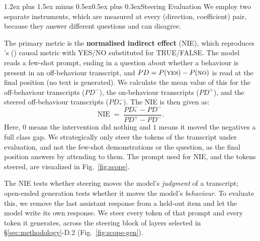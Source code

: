 \documentclass[conference]{IEEEtran}
\makeatletter
\renewcommand{\subsubsection}{\@startsection{subsubsection}{3}{1em}%
  {1.2ex plus 1.5ex minus 0.5ex}{0.5ex plus 0.3ex}{\normalfont\normalsize\itshape}}
\makeatother
\begin{document}
\subsubsection{Steering Evaluation}
\label{sec:steereval}
We employ two separate instruments, which are measured at every
(direction, coefficient) pair, because they answer different questions and can
disagree.

The primary metric is the \textbf{normalised indirect effect} (NIE), which reproduces
\citeauthor{marks2024}'s (\citeyear{marks2024}) causal metric with YES/NO substituted for TRUE/FALSE.
The model reads a few-shot prompt, ending in a question about whether a
behaviour is present in an off-behaviour transcript, and
$PD = P(\textsc{yes}) - P(\textsc{no})$ is read at the final position (no text
is generated). We calculate the mean value of this for the off-behaviour
transcripts ($PD^{-}$), the on-behaviour transcripts ($PD^{+}$), and the
steered off-behaviour transcripts ($PD^{-}_{*}$). The NIE is then given as:
\begin{equation}
\mathrm{NIE} \;=\; \frac{PD^{-}_{*} - PD^{-}}{PD^{+} - PD^{-}} .
\label{eq:nie}
\end{equation}
Here, $0$ means the intervention did nothing and $1$ means it moved the
negatives a full class gap. 
We strategically only steer the tokens of the transcript under evaluation, and
not the few-shot demonstrations or the question, as the final position answers by
attending to them. The prompt used for NIE, and the tokens steered, are
visualized in Fig.~\ref{fig:scope}.

The NIE tests whether steering moves the model's \emph{judgment} of a
transcript; open-ended generation tests whether it moves the model's
\emph{behaviour}. To
evaluate this, we remove the last assistant response from a held-out item and let the
model write its own response. We steer every
token of that prompt and every token it generates, across the steering block of
layers selected in §\ref{sec:methodology}-D.2 (Fig.~\ref{fig:scope-gen}).
\end{document}
